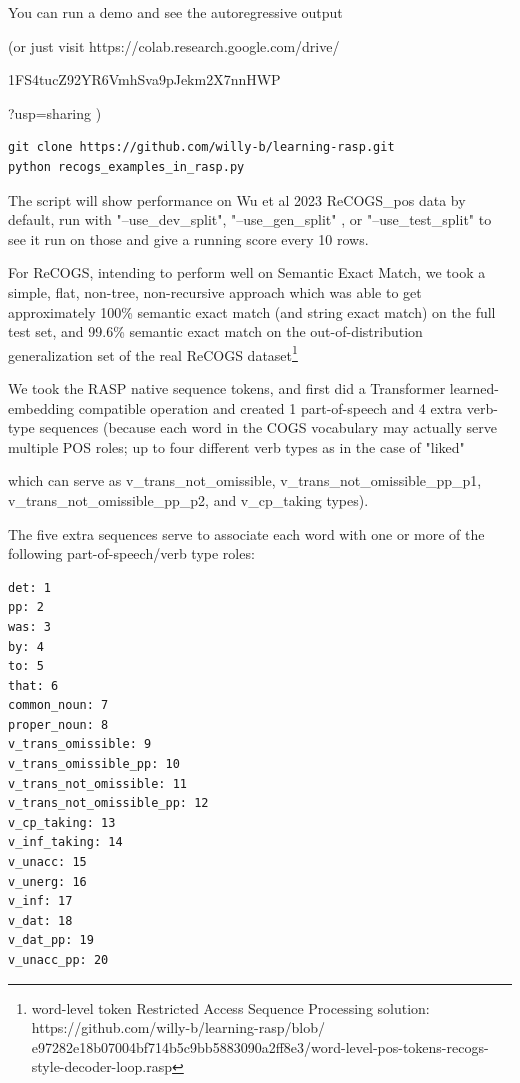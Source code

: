 \documentclass[11pt]{article}
\begin{document}
You can run a demo and see the autoregressive output 

(or just visit https://colab.research.google.com/drive/

1FS4tucZ92YR6VmhSva9pJekm2X7nnHWP

?usp=sharing  )

\begin{tiny}
\begin{verbatim}
git clone https://github.com/willy-b/learning-rasp.git
python recogs_examples_in_rasp.py 
\end{verbatim}
\end{tiny}

The script will show performance on Wu et al 2023 ReCOGS\_pos data by default, run with "--use\_dev\_split", "--use\_gen\_split" , or "--use\_test\_split" to see it run on those and give a running score every 10 rows.

For ReCOGS, intending to perform well on Semantic Exact Match, we took a simple, flat, non-tree, non-recursive approach which was able to get approximately 100\% semantic exact match (and string exact match) on the full test set, and 99.6\% semantic exact match on the out-of-distribution generalization set of the real ReCOGS dataset\footnote{ word-level token Restricted Access Sequence Processing solution: https://github.com/willy-b/learning-rasp/blob/
e97282e18b07004bf714b5c9bb5883090a2ff8e3/word-level-pos-tokens-recogs-style-decoder-loop.rasp }

We took the RASP native sequence tokens, and first did a Transformer learned-embedding compatible operation and created 1 part-of-speech and 4 extra verb-type sequences (because each word in the COGS vocabulary may actually serve multiple POS roles; up to four different verb types as in the case of "liked" 

which can serve as v\_trans\_not\_omissible, v\_trans\_not\_omissible\_pp\_p1, v\_trans\_not\_omissible\_pp\_p2, and v\_cp\_taking types). 

The five extra sequences serve to associate each word with one or more of the following part-of-speech/verb type roles:
\begin{tiny}
\begin{verbatim}
det: 1
pp: 2
was: 3
by: 4
to: 5
that: 6
common_noun: 7
proper_noun: 8
v_trans_omissible: 9
v_trans_omissible_pp: 10
v_trans_not_omissible: 11
v_trans_not_omissible_pp: 12
v_cp_taking: 13
v_inf_taking: 14
v_unacc: 15
v_unerg: 16
v_inf: 17
v_dat: 18
v_dat_pp: 19
v_unacc_pp: 20
\end{verbatim}
\end{tiny}
\end{document}
